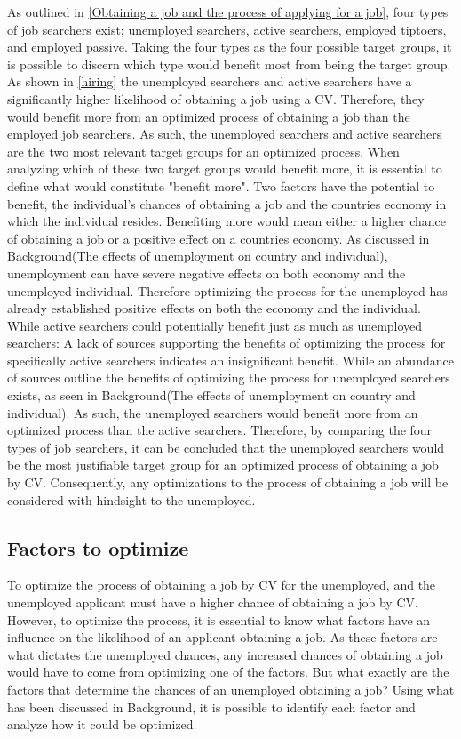 As outlined in \ref{Obtaining a job and the process of applying for a job}, four types of job searchers exist; unemployed searchers, active searchers, employed tiptoers, and employed passive.
Taking the four types as the four possible target groups, it is possible to discern which type would benefit most from being the target group.
As shown in \ref{hiring} the unemployed searchers and active searchers have a significantly higher likelihood of obtaining a job using a CV.
Therefore, they would benefit more from an optimized process of obtaining a job than the employed job searchers.
As such, the unemployed searchers and active searchers are the two most relevant target groups for an optimized process.
When analyzing which of these two target groups would benefit more, it is essential to define what would constitute "benefit more".
Two factors have the potential to benefit, the individual's chances of obtaining a job and the countries economy in which the individual resides.
Benefiting more would mean either a higher chance of obtaining a job or a positive effect on a countries economy.
As discussed in Background(The effects of unemployment on country and individual), unemployment can have severe negative effects on both economy and the unemployed individual.
Therefore optimizing the process for the unemployed has already established positive effects on both the economy and the individual.
While active searchers could potentially benefit just as much as unemployed searchers:
A lack of sources supporting the benefits of optimizing the process for specifically active searchers indicates an insignificant benefit.
While an abundance of sources outline the benefits of optimizing the process for unemployed searchers exists, as seen in Background(The effects of unemployment on country and individual).
As such, the unemployed searchers would benefit more from an optimized process than the active searchers.
Therefore, by comparing the four types of job searchers, it can be concluded that the unemployed searchers would be the most justifiable target group for an optimized process of obtaining a job by CV.
Consequently, any optimizations to the process of obtaining a job will be considered with hindsight to the unemployed. \\
 
\subsection{Factors to optimize}
To optimize the process of obtaining a job by CV for the unemployed, and the unemployed applicant must have a higher chance of obtaining a job by CV.
However, to optimize the process, it is essential to know what factors have an influence on the likelihood of an applicant obtaining a job.
As these factors are what dictates the unemployed chances, any increased chances of obtaining a job would have to come from optimizing one of the factors.
But what exactly are the factors that determine the chances of an unemployed obtaining a job?
Using what has been discussed in Background, it is possible to identify each factor and analyze how it could be optimized. \\

